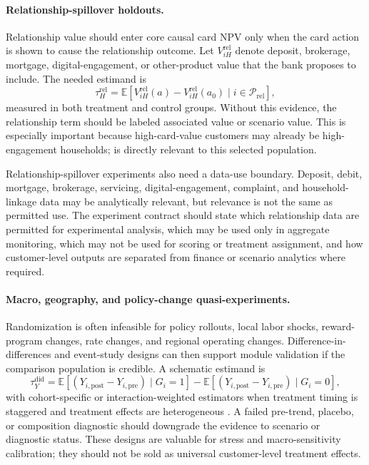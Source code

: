 \documentclass[11pt]{article}
\newcommand{\E}{\mathbb{E}}
\newcommand{\1}{\mathbf{1}}
\begin{document}
\paragraph{Relationship-spillover holdouts.}
Relationship value should enter core causal card NPV only when the card action
is shown to cause the relationship outcome. Let $V^{\mathrm{rel}}_{iH}$ denote
deposit, brokerage, mortgage, digital-engagement, or other-product value that
the bank proposes to include. The needed estimand is
\begin{equation}
  \tau^{\mathrm{rel}}_{H}
  =
  \E[V^{\mathrm{rel}}_{iH}(a)-V^{\mathrm{rel}}_{iH}(a_0)
  \mid i\in\mathcal{P}_{\mathrm{rel}}],
  \label{eq:relationship-spillover}
\end{equation}
measured in both treatment and control groups. Without this evidence, the
relationship term should be labeled associated value or scenario value. This
is especially important because high-card-value customers may already be
high-engagement households; \citet{heckman1979selection} is directly relevant
to this selected population.

Relationship-spillover experiments also need a data-use boundary. Deposit,
debit, mortgage, brokerage, servicing, digital-engagement, complaint, and
household-linkage data may be analytically relevant, but relevance is not the
same as permitted use. The experiment contract should state which relationship
data are permitted for experimental analysis, which may be used only in
aggregate monitoring, which may not be used for scoring or treatment
assignment, and how customer-level outputs are separated from finance or
scenario analytics where required.

\paragraph{Macro, geography, and policy-change quasi-experiments.}
Randomization is often infeasible for policy rollouts, local labor shocks,
reward-program changes, rate changes, and regional operating changes.
Difference-in-differences and event-study designs can then support module
validation if the comparison population is credible. A schematic estimand is
\begin{equation}
  \tau^{\mathrm{did}}_Y
  =
  \E[(Y_{i,\mathrm{post}}-Y_{i,\mathrm{pre}})\mid G_i=1]
  -
  \E[(Y_{i,\mathrm{post}}-Y_{i,\mathrm{pre}})\mid G_i=0],
  \label{eq:did-estimand}
\end{equation}
with cohort-specific or interaction-weighted estimators when treatment timing
is staggered and treatment effects are heterogeneous
\citep{callaway2021did,sun2021eventstudy}. A failed pre-trend, placebo, or
composition diagnostic should downgrade the evidence to scenario or diagnostic
status. These designs are valuable for stress and macro-sensitivity
calibration; they should not be sold as universal customer-level treatment
effects.
\end{document}
